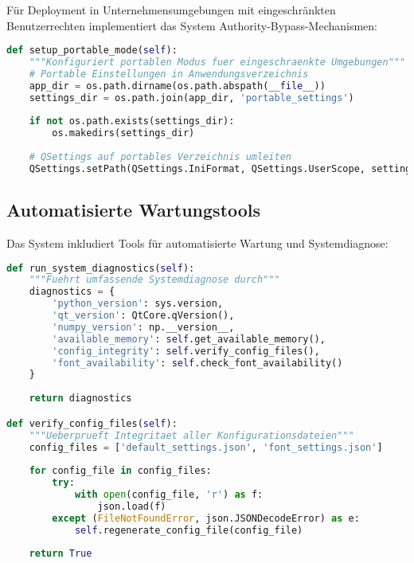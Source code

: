 Für Deployment in Unternehmensumgebungen mit eingeschränkten Benutzerrechten implementiert das System Authority-Bypass-Mechanismen:

\begin{lstlisting}[language=Python, caption=Authority-Bypass Implementation]
def setup_portable_mode(self):
    """Konfiguriert portablen Modus fuer eingeschraenkte Umgebungen"""
    # Portable Einstellungen in Anwendungsverzeichnis
    app_dir = os.path.dirname(os.path.abspath(__file__))
    settings_dir = os.path.join(app_dir, 'portable_settings')
    
    if not os.path.exists(settings_dir):
        os.makedirs(settings_dir)
    
    # QSettings auf portables Verzeichnis umleiten
    QSettings.setPath(QSettings.IniFormat, QSettings.UserScope, settings_dir)
\end{lstlisting}

\subsection{Automatisierte Wartungstools}

Das System inkludiert Tools für automatisierte Wartung und Systemdiagnose:

\begin{lstlisting}[language=Python, caption=Systemdiagnose und Wartung]
def run_system_diagnostics(self):
    """Fuehrt umfassende Systemdiagnose durch"""
    diagnostics = {
        'python_version': sys.version,
        'qt_version': QtCore.qVersion(),
        'numpy_version': np.__version__,
        'available_memory': self.get_available_memory(),
        'config_integrity': self.verify_config_files(),
        'font_availability': self.check_font_availability()
    }
    
    return diagnostics

def verify_config_files(self):
    """Ueberprueft Integritaet aller Konfigurationsdateien"""
    config_files = ['default_settings.json', 'font_settings.json']
    
    for config_file in config_files:
        try:
            with open(config_file, 'r') as f:
                json.load(f)
        except (FileNotFoundError, json.JSONDecodeError) as e:
            self.regenerate_config_file(config_file)
            
    return True
\end{lstlisting}